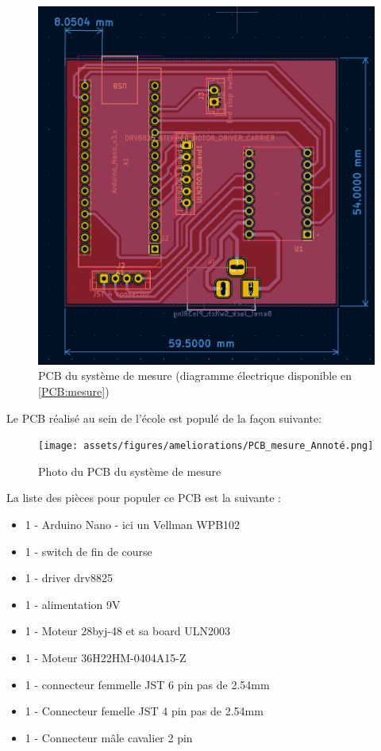 \begin{figure}[H]
    \centering
    \includegraphics[width = \textwidth]{assets/figures/ameliorations/PCB_rotation_translation.png}
    \caption[PCB du système de mesure]{PCB du système de mesure (diagramme électrique disponible en \autoref{PCB:mesure})}
\end{figure}

\newpage
Le PCB réalisé au sein de l'école est populé de la façon suivante:

\begin{figure}[H]
    \centering
    \texttt{[image: assets/figures/ameliorations/PCB\_mesure\_Annoté.png]}
    \caption[Photo du PCB du système de mesure]{Photo du PCB du système de mesure}
\end{figure}

La liste des pièces pour populer ce PCB est la suivante :
\begin{itemize}
    \item 1 - Arduino Nano - ici un Vellman WPB102
    \item 1 - switch de fin de course
    \item 1 - driver drv8825
    \item 1 - alimentation 9V
    \item 1 - Moteur 28byj-48 et sa board ULN2003
    \item 1 - Moteur 36H22HM-0404A15-Z
    \item 1 - connecteur femmelle JST 6 pin pas de 2.54mm
    \item 1 - Connecteur femelle JST 4 pin pas de 2.54mm
    \item 1 - Connecteur mâle cavalier 2 pin
\end{itemize}

